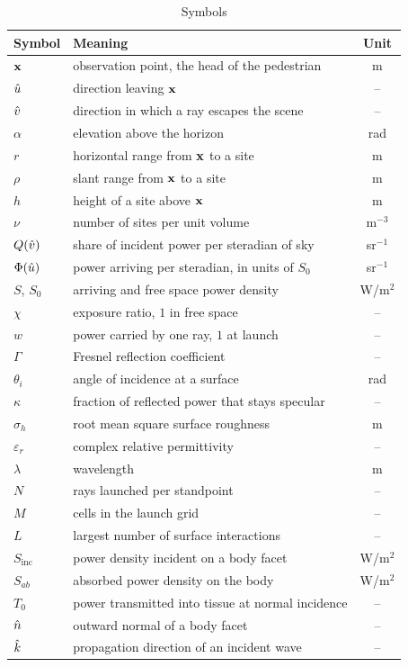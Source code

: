 \begin{table}[!t]
  \caption{Symbols}
  \label{tab:symbols}
  \centering
  \begin{tabular}{llc}
    \toprule
    Symbol & Meaning & Unit \\
    \midrule
    $\mathbf{x}$ & observation point, the head of the pedestrian & m \\
    $\hat{u}$ & direction leaving $\mathbf{x}$ & -- \\
    $\hat{v}$ & direction in which a ray escapes the scene & -- \\
    $\alpha$ & elevation above the horizon & rad \\
    $r$ & horizontal range from $\mathbf{x}$ to a site & m \\
    $\rho$ & slant range from $\mathbf{x}$ to a site & m \\
    $h$ & height of a site above $\mathbf{x}$ & m \\
    $\nu$ & number of sites per unit volume & m$^{-3}$ \\
    $Q(\hat{v})$ & share of incident power per steradian of sky & sr$^{-1}$ \\
    $\Phi(\hat{u})$ & power arriving per steradian, in units of $S_0$ & sr$^{-1}$ \\
    $S$, $S_0$ & arriving and free space power density & W/m$^2$ \\
    $\chi$ & exposure ratio, $1$ in free space & -- \\
    $w$ & power carried by one ray, $1$ at launch & -- \\
    $\Gamma$ & Fresnel reflection coefficient & -- \\
    $\theta_i$ & angle of incidence at a surface & rad \\
    $\kappa$ & fraction of reflected power that stays specular & -- \\
    $\sigma_h$ & root mean square surface roughness & m \\
    $\varepsilon_r$ & complex relative permittivity & -- \\
    $\lambda$ & wavelength & m \\
    $N$ & rays launched per standpoint & -- \\
    $M$ & cells in the launch grid & -- \\
    $L$ & largest number of surface interactions & -- \\
    $S_{\mathrm{inc}}$ & power density incident on a body facet & W/m$^2$ \\
    $S_{ab}$ & absorbed power density on the body & W/m$^2$ \\
    $T_0$ & power transmitted into tissue at normal incidence & -- \\
    $\hat{n}$ & outward normal of a body facet & -- \\
    $\hat{k}$ & propagation direction of an incident wave & -- \\
    \bottomrule
  \end{tabular}
\end{table}

